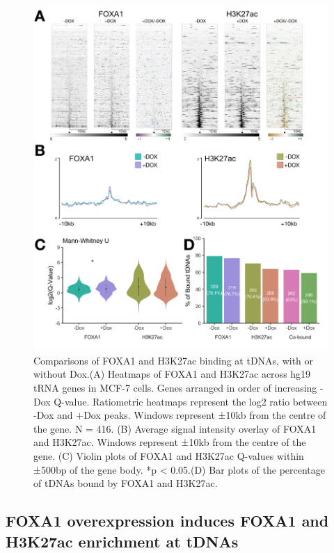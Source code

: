 \documentclass[
  12pt,
]{article}
\begin{document}
\begin{figure}[p]
\includegraphics[width=1\linewidth]{../images/results-01} \caption{Comparisons of FOXA1 and H3K27ac binding at tDNAs, with or without Dox.(A) Heatmaps of FOXA1 and H3K27ac across hg19 tRNA genes in MCF-7 cells. Genes arranged in order of increasing -Dox Q-value. Ratiometric heatmaps represent the log2 ratio between -Dox and +Dox peaks. Windows represent ±10kb from the centre of the gene. N = 416. (B) Average signal intensity overlay of FOXA1 and H3K27ac. Windows represent ±10kb from the centre of the gene. (C) Violin plots of FOXA1 and H3K27ac Q-values within ±500bp of the gene body. *p < 0.05.(D) Bar plots of the percentage of tDNAs bound by FOXA1 and H3K27ac. }\label{fig:results-1}
\end{figure}

\hypertarget{foxa1-overexpression-induces-foxa1-and-h3k27ac-enrichment-at-tdnas}{%
\subsection{FOXA1 overexpression induces FOXA1 and H3K27ac enrichment at tDNAs}\label{foxa1-overexpression-induces-foxa1-and-h3k27ac-enrichment-at-tdnas}}
\end{document}
